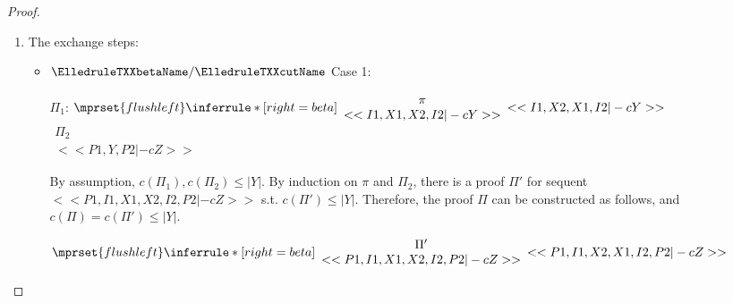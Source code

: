 \begin{proof}
\begin{enumerate}
\begin{itemize}
    
    \end{itemize}
  
  \item The exchange steps:
    \begin{itemize}
    \item $\ElledruleTXXbetaName / \ElledruleTXXcutName$ Case 1:
      \begin{center}
        \scriptsize
        $\Pi_1$:
        \begin{math}
          $$\mprset{flushleft}
          \inferrule* [right={\tiny beta}] {
            {
              \begin{array}{c}
                \pi \\
                {<<I1, X1, X2, I2 |-c Y>>}
              \end{array}
            }
          }{<<I1, X2, X1, I2 |-c Y>>}
        \end{math}
        \qquad\qquad
        \begin{math}
          \begin{array}{c}
            \Pi_2 \\
            {<<P1, Y, P2 |-c Z>>}
          \end{array}
        \end{math}
      \end{center}
      By assumption, $c(\Pi_1),c(\Pi_2)\leq |Y|$. By induction on $\pi$ and $\Pi_2$, there is
      a proof $\Pi'$ for sequent $<<P1, I1, X1, X2, I2, P2 |-c Z>>$ s.t. $c(\Pi')\leq|Y|$.
      Therefore, the proof $\Pi$ can be constructed as follows, and $c(\Pi)=c(\Pi')\leq|Y|$.
      \begin{center}
        \scriptsize
        \begin{math}
          $$\mprset{flushleft}
          \inferrule* [right={\tiny beta}] {
            {
              \begin{array}{c}
                \Pi' \\
                {<<P1, I1, X1, X2, I2, P2 |-c Z>>}
              \end{array}
            }
          }{<<P1, I1, X2, X1, I2, P2 |-c Z>>}
        \end{math}
      \end{center}


\end{itemize}
\end{enumerate}
\end{proof}

